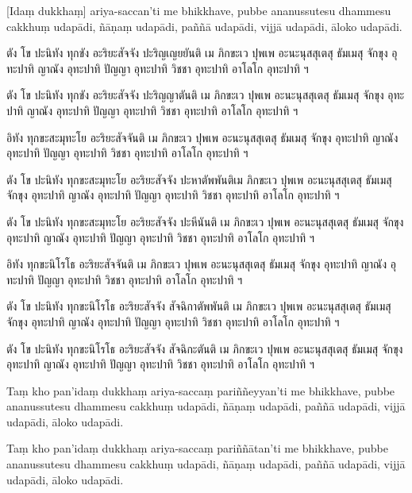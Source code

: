 \documentclass[
  babelLanguage=thai,
  final,
]{chantingbook}
\begin{document}
\enlargethispage{\baselineskip}

[Idaṃ dukkhaṃ] ariya-saccan'ti me bhikkhave, pubbe ananussutesu dhammesu
cakkhuṃ udapādi, ñāṇaṃ udapādi, paññā udapādi, vijjā udapādi, āloko
udapādi.

\clearpage

\thaiText
\markboth{\thaiTitle}{\rightmark}

ตัง โข ปะนิทัง ทุกขัง อะริยะสัจจัง ปะริญเญยยันติ เม ภิกขะเว ปุพเพ อะนะนุสสุเตสุ
ธัมเมสุ จักขุง อุทะปาทิ ญาณัง อุทะปาทิ ปัญญา อุทะปาทิ วิชชา อุทะปาทิ อาโลโก อุทะปาทิ ฯ

ตัง โข ปะนิทัง ทุกขัง อะริยะสัจจัง ปะริญญาตันติ เม ภิกขะเว ปุพเพ อะนะนุสสุเตสุ ธัมเมสุ จักขุง
อุทะปาทิ ญาณัง อุทะปาทิ ปัญญา อุทะปาทิ วิชชา อุทะปาทิ อาโลโก อุทะปาทิ ฯ

อิทัง ทุกขะสะมุทะโย อะริยะสัจจันติ เม ภิกขะเว ปุพเพ อะนะนุสสุเตสุ ธัมเมสุ
จักขุง อุทะปาทิ ญาณัง อุทะปาทิ ปัญญา อุทะปาทิ วิชชา อุทะปาทิ อาโลโก อุทะปาทิ ฯ

ตัง โข ปะนิทัง ทุกขะสะมุทะโย อะริยะสัจจัง ปะหาตัพพันติเม ภิกขะเว ปุพเพ อะนะนุสสุเตสุ
ธัมเมสุ จักขุง อุทะปาทิ ญาณัง อุทะปาทิ ปัญญา อุทะปาทิ วิชชา อุทะปาทิ อาโลโก อุทะปาทิ ฯ

ตัง โข ปะนิทัง ทุกขะสะมุทะโย อะริยะสัจจัง ปะหีนันติ เม ภิกขะเว ปุพเพ อะนะนุสสุเตสุ ธัมเมสุ
จักขุง อุทะปาทิ ญาณัง อุทะปาทิ ปัญญา อุทะปาทิ วิชชา อุทะปาทิ อาโลโก อุทะปาทิ ฯ

อิทัง ทุกขะนิโรโธ อะริยะสัจจันติ เม ภิกขะเว ปุพเพ อะนะนุสสุเตสุ ธัมเมสุ จักขุง
อุทะปาทิ ญาณัง อุทะปาทิ ปัญญา อุทะปาทิ วิชชา อุทะปาทิ อาโลโก อุทะปาทิ ฯ

ตัง โข ปะนิทัง ทุกขะนิโรโธ อะริยะสัจจัง สัจฉิกาตัพพันติ เม ภิกขะเว ปุพเพ อะนะนุสสุเตสุ
ธัมเมสุ จักขุง อุทะปาทิ ญาณัง อุทะปาทิ ปัญญา อุทะปาทิ วิชชา อุทะปาทิ อาโลโก อุทะปาทิ ฯ

ตัง โข ปะนิทัง ทุกขะนิโรโธ อะริยะสัจจัง สัจฉิกะตันติ เม ภิกขะเว ปุพเพ อะนะนุสสุเตสุ ธัมเมสุ
จักขุง อุทะปาทิ ญาณัง อุทะปาทิ ปัญญา อุทะปาทิ วิชชา อุทะปาทิ อาโลโก อุทะปาทิ ฯ

\clearpage

\paliText
\markboth{\paliTitle}{\rightmark}

Taṃ kho pan'idaṃ dukkhaṃ ariya-saccaṃ pariññeyyan'ti me bhikkhave, pubbe
ananussutesu dhammesu cakkhuṃ udapādi, ñāṇaṃ udapādi, paññā udapādi,
vijjā udapādi, āloko udapādi.

Taṃ kho pan'idaṃ dukkhaṃ ariya-saccaṃ pariññātan'ti me bhikkhave, pubbe
ananussutesu dhammesu cakkhuṃ udapādi, ñāṇaṃ udapādi, paññā udapādi,
vijjā udapādi, āloko udapādi.
\end{document}
